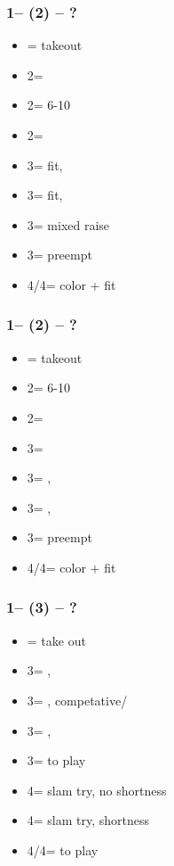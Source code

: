 \documentclass[12pt, a4paper]{report}
\begin{document}
\subsubsection*{1\spades -- (2\diams) -- ?}
\begin{itemize}
    \item \dbl = takeout
    \item 2\hearts = \fonce
    \item 2\spades = 6-10
    \item 2\nt = \clubs\ \invp
    \item 3\clubs = fit, \gf
    \item 3\diams = fit, \inv
    \item 3\hearts = mixed raise
    \item 3\spades = preempt
    \item 4\clubs/4\hearts = color + fit
\end{itemize}

\subsubsection*{1\spades -- (2\hearts) -- ?}
\begin{itemize}
    \item \dbl = takeout
    \item 2\spades = 6-10
    \item 2\nt = \clubs\ \invp
    \item 3\clubs = \diams\ \invp
    \item 3\diams = \spades, \gf
    \item 3\hearts = \spades, \inv
    \item 3\spades = preempt
    \item 4\clubs/4\diams = color + fit
\end{itemize}

\subsubsection*{1\spades -- (3\clubs) -- ?}
\begin{itemize}
    \item \dbl = take out
    \item 3\diams = \hearts, \invp
    \item 3\hearts = \spades, competative/\gf
    \item 3\spades = \spades, \inv
    \item 3\nt = to play
    \item 4\clubs = slam try, no \clubs shortness
    \item 4\diams = slam try, \clubs shortness
    \item 4\hearts/4\spades = to play
\end{itemize}
\end{document}
